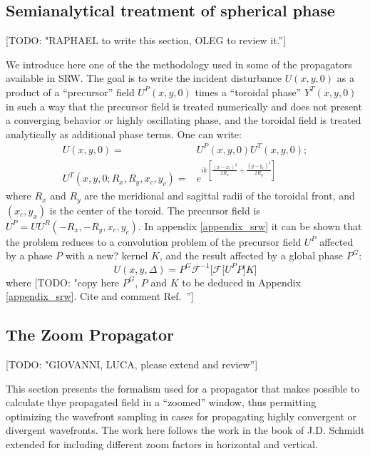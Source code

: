 \documentclass{iucr}              %
\newcommand{\todo}[1]{{\color{red}[TODO: "#1'']}}
\newcommand{\inred}[1]{{\color{red}#1}}
\begin{document}
\subsection{Semianalytical treatment of spherical phase}
\label{subch: semianalytical}

\todo{RAPHAEL to write this section, OLEG to review it.}

We introduce here one of the the methodology used in some of the propagators available in SRW. The goal is to write the incident disturbance $U(x,y,0)$ as a product of a ``precursor'' field $U^P(x,y,0)$ times a ``toroidal phase'' $Y^T(x,y,0)$ in such a way that the precursor field is treated numerically and does not present a converging behavior or highly oscillating phase, and the toroidal field is treated analytically as additional phase terms. One can write: 
\begin{equation}
\begin{aligned}
U(x,y,0) =& U^P(x,y,0) U^T(x,y,0); \\
U^T(x,y,0;R_x,R_y,x_c,y_c) =& e^{ik [\frac{(x-x_c)^2}{2 R_x} + \frac{(y-y_c)^2}{2 R_y}]}
\end{aligned}
\end{equation}
where $R_x$ and $R_y$ are the meridional and sagittal radii of the toroidal front, and $(x_c,y_x)$ is the center of the toroid. The precursor field is $U^P=U U^R(-R_x,-R_y,x_c,y_c)$. 
In appendix \ref{appendix_srw} it can be shown that the problem reduces to a convolution problem of the precursor field $U^P$ affected by a phase $P$ with a \inred{new?} kernel $K$, and the result affected by a global phase $P^G$: 
\begin{equation}
\label{eq: srw in convolution form}
U(x, y, \Delta) = P^G \mathcal{F}^{-1}\Big[\mathcal{F}\big[U^P P \big] K \Big]
\end{equation}
where \todo{copy here $P^G$, $P$ and $K$ to be deduced in Appendix \ref{appendix_srw}. Cite and comment Ref.~\cite{wyrowski}}


\subsection{The Zoom Propagator}
\label{subch: zoom}

\todo{GIOVANNI, LUCA, please extend and review}

This section presents the formalism used for a propagator that makes possible to calculate thye propagated field in a ``zoomed'' window, thus permitting optimizing the wavefront sampling in cases for propagating highly convergent or divergent wavefronts. The work here follows the work in the book of J.D. Schmidt \cite{schmidt} extended for including different zoom factors in horizontal and vertical. 
\end{document}
